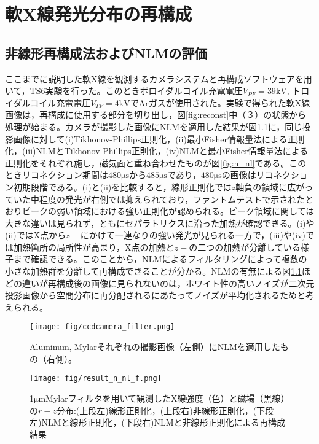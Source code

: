 \chapter{軟X線発光分布の再構成}
\section{非線形再構成法およびNLMの評価}
ここまでに説明した軟X線を観測するカメラシステムと再構成ソフトウェアを用いて，TS6実験を行った。このときポロイダルコイル充電電圧$V_{PF} = 39\mathrm{kV}$, トロイダルコイル充電電圧$V_{TF} = 4\mathrm{kV}$で$\mathrm{Ar}$ガスが使用された。実験で得られた軟X線画像は，再構成に使用する部分を切り出し，図\ref{fig:reconst}中（３）の状態から処理が始まる。カメラが撮影した画像にNLMを適用した結果が図\ref{fig:filter_camera}に，同じ投影画像に対して(i)Tikhonov-Phillips正則化，(ii)最小Fisher情報量法による正則化，(iii)NLMとTikhonov-Phillips正則化，(iv)NLMと最小Fisher情報量法による正則化をそれぞれ施し，磁気面と重ね合わせたものが図\ref{fig:n_nl}である。このときリコネクション期間は$480\mathrm{\mu s} から 485\mathrm{\mu s}$であり，$480\mathrm{\mu s}$の画像はリコネクション初期段階である。(i)と(ii)を比較すると，線形正則化では$z$軸負の領域に広がっていた中程度の発光が右側では抑えられており，ファントムテストで示されたとおりピークの弱い領域における強い正則化が認められる。ピーク領域に関しては大きな違いは見られず，ともにセパラトリクスに沿った加熱が確認できる。(i)や(ii)ではX点から$z-$にかけて一連なりの強い発光が見られる一方で，(iii)や(iv)では加熱箇所の局所性が高まり，X点の加熱と$z-$の二つの加熱が分離している様子まで確認できる。このことから，NLMによるフィルタリングによって複数の小さな加熱群を分離して再構成できることが分かる。NLMの有無による図\ref{fig:filter_camera}ほどの違いが再構成後の画像に見られないのは，ホワイト性の高いノイズが二次元投影画像から空間分布に再分配されるにあたってノイズが平均化されるためと考えられる。
\begin{figure}[H]
   \centering
   \texttt{[image: fig/ccdcamera\_filter.png]}
   \caption{Aluminum, Mylarそれぞれの撮影画像（左側）にNLMを適用したもの（右側）。}
   \label{fig:filter_camera}
\end{figure}
\begin{figure}[H]
   \centering
   \texttt{[image: fig/result\_n\_nl\_f.png]}
   \caption{1$\mathrm{\mu m}$Mylarフィルタを用いて観測したX線強度（色）と磁場（黒線）の$r-z$分布:(上段左)線形正則化，(上段右)非線形正則化，(下段左)NLMと線形正則化，(下段右)NLMと非線形正則化による再構成結果}
   \label{fig:n_nl_f}
\end{figure}

